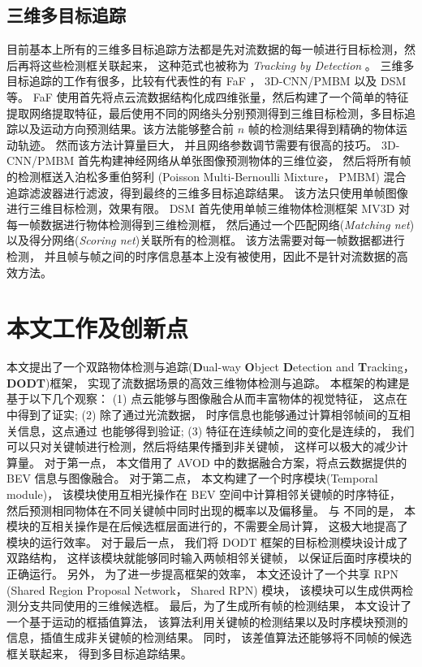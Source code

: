 \subsection{三维多目标追踪}
\label{tracking}
目前基本上所有的三维多目标追踪方法都是先对流数据的每一帧进行目标检测，然后再将这些检测框关联起来， 这种范式也被称为 \textit{Tracking by Detection} \cite{lenz2015followme}。 三维多目标追踪的工作有很多，比较有代表性的有 FaF \cite{luo2018fast}， 3D-CNN/PMBM \cite{scheidegger2018mono}以及 DSM \cite{frossard2018end}等。 FaF 使用首先将点云流数据结构化成四维张量，然后构建了一个简单的特征提取网络提取特征，最后使用不同的网络头分别预测得到三维目标检测，多目标追踪以及运动方向预测结果。该方法能够整合前 $n$ 帧的检测结果得到精确的物体运动轨迹。 然而该方法计算量巨大， 并且网络参数调节需要有很高的技巧。  3D-CNN/PMBM 首先构建神经网络从单张图像预测物体的三维位姿， 然后将所有帧的检测框送入泊松多重伯努利 (Poisson Multi-Bernoulli Mixture， PMBM) 混合追踪滤波器进行滤波，得到最终的三维多目标追踪结果。 该方法只使用单帧图像进行三维目标检测，效果有限。 DSM 首先使用单帧三维物体检测框架 MV3D \cite{chen2017multi} 对每一帧数据进行物体检测得到三维检测框， 然后通过一个匹配网络(\textit{Matching net})以及得分网络(\textit{Scoring net})关联所有的检测框。 该方法需要对每一帧数据都进行检测， 并且帧与帧之间的时序信息基本上没有被使用，因此不是针对流数据的高效方法。

\section{本文工作及创新点}
\label{subsec:contribution}
本文提出了一个双路物体检测与追踪(\textbf{D}ual-way \textbf{O}bject \textbf{D}etection and \textbf{T}racking， \textbf{DODT})框架， 实现了流数据场景的高效三维物体检测与追踪。 本框架的构建是基于以下几个观察： (1) 点云能够与图像融合从而丰富物体的视觉特征， 这点在 \cite{chen2017multi,ku2018joint}中得到了证实; (2) 除了通过光流数据， 时序信息也能够通过计算相邻帧间的互相关信息，这点通过 \cite{feichtenhofer2017detect} 也能够得到验证; (3) 特征在连续帧之间的变化是连续的， 我们可以只对关键帧进行检测，然后将结果传播到非关键帧， 这样可以极大的减少计算量。 对于第一点， 本文借用了 AVOD\cite{ku2018joint} 中的数据融合方案，将点云数据提供的 BEV 信息与图像融合。 对于第二点， 本文构建了一个时序模块(Temporal module)， 该模块使用互相光操作在 BEV 空间中计算相邻关键帧的时序特征， 然后预测相同物体在不同关键帧中同时出现的概率以及偏移量。 与 \cite{feichtenhofer2017detect,dosovitskiy2015flownet} 不同的是， 本模块的互相关操作是在后候选框层面进行的，不需要全局计算， 这极大地提高了模块的运行效率。 对于最后一点， 我们将 DODT 框架的目标检测模块设计成了双路结构， 这样该模块就能够同时输入两帧相邻关键帧， 以保证后面时序模块的正确运行。 另外， 为了进一步提高框架的效率， 本文还设计了一个共享 RPN (Shared Region Proposal Network， Shared RPN) 模块， 该模块可以生成供两检测分支共同使用的三维候选框。 最后，为了生成所有帧的检测结果， 本文设计了一个基于运动的框插值算法， 该算法利用关键帧的检测结果以及时序模块预测的信息，插值生成非关键帧的检测结果。 同时， 该差值算法还能够将不同帧的候选框关联起来， 得到多目标追踪结果。

